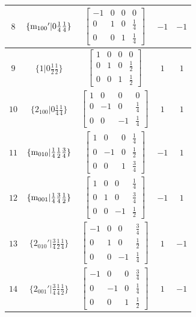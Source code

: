 \documentclass[fleqn,8pt]{jsarticle}
\begin{document}
\begin{longtable}{ccccc}
$ 8 $ & $ \{{\rm m}_{100}{}'|0 \frac{1}{4} \frac{1}{4}\} $ & $ \begin{bmatrix} -1 & 0 & 0 & 0 \\ 0 & 1 & 0 & \frac{1}{4} \\ 0 & 0 & 1 & \frac{1}{4} \end{bmatrix} $ & $ -1 $ & $ -1 $ \\ \hline
$ 9 $ & $ \{1|0 \frac{1}{2} \frac{1}{2}\} $ & $ \begin{bmatrix} 1 & 0 & 0 & 0 \\ 0 & 1 & 0 & \frac{1}{2} \\ 0 & 0 & 1 & \frac{1}{2} \end{bmatrix} $ & $ 1 $ & $ 1 $ \\ \hline
$ 10 $ & $ \{2{}_{100}|0 \frac{1}{4} \frac{1}{4}\} $ & $ \begin{bmatrix} 1 & 0 & 0 & 0 \\ 0 & -1 & 0 & \frac{1}{4} \\ 0 & 0 & -1 & \frac{1}{4} \end{bmatrix} $ & $ 1 $ & $ 1 $ \\ \hline
$ 11 $ & $ \{{\rm m}_{010}|\frac{1}{4} \frac{1}{2} \frac{3}{4}\} $ & $ \begin{bmatrix} 1 & 0 & 0 & \frac{1}{4} \\ 0 & -1 & 0 & \frac{1}{2} \\ 0 & 0 & 1 & \frac{3}{4} \end{bmatrix} $ & $ -1 $ & $ 1 $ \\ \hline
$ 12 $ & $ \{{\rm m}_{001}|\frac{1}{4} \frac{3}{4} \frac{1}{2}\} $ & $ \begin{bmatrix} 1 & 0 & 0 & \frac{1}{4} \\ 0 & 1 & 0 & \frac{3}{4} \\ 0 & 0 & -1 & \frac{1}{2} \end{bmatrix} $ & $ -1 $ & $ 1 $ \\ \hline
$ 13 $ & $ \{2{}_{010}{}'|\frac{3}{4} \frac{1}{2} \frac{1}{4}\} $ & $ \begin{bmatrix} -1 & 0 & 0 & \frac{3}{4} \\ 0 & 1 & 0 & \frac{1}{2} \\ 0 & 0 & -1 & \frac{1}{4} \end{bmatrix} $ & $ 1 $ & $ -1 $ \\ \hline
$ 14 $ & $ \{2{}_{001}{}'|\frac{3}{4} \frac{1}{4} \frac{1}{2}\} $ & $ \begin{bmatrix} -1 & 0 & 0 & \frac{3}{4} \\ 0 & -1 & 0 & \frac{1}{4} \\ 0 & 0 & 1 & \frac{1}{2} \end{bmatrix} $ & $ 1 $ & $ -1 $ \\ \hline

\end{longtable}
\end{document}
